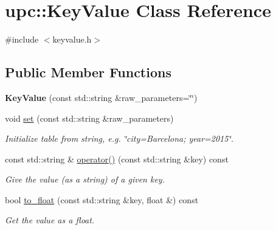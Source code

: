 \hypertarget{classupc_1_1KeyValue}{}\section{upc\+:\+:Key\+Value Class Reference}
\label{classupc_1_1KeyValue}


{\ttfamily \#include $<$keyvalue.\+h$>$}

\subsection*{Public Member Functions}
\begin{DoxyCompactItemize}
\item 
\mbox{\label{classupc_1_1KeyValue_a16e43218b2cdf234929ad76c6a28de51}} 
{\bfseries Key\+Value} (const std\+::string \&raw\+\_\+parameters=\char`\"{}\char`\"{})
\item 
\mbox{\label{classupc_1_1KeyValue_aff88fb11aa97cd85fa0b398e34ed763a}} 
void \hyperlink{classupc_1_1KeyValue_aff88fb11aa97cd85fa0b398e34ed763a}{set} (const std\+::string \&raw\+\_\+parameters)
\begin{DoxyCompactList}\small\item\em Initialize table from string, e.\+g. \char`\"{}city=\+Barcelona; year=2015\char`\"{}. \end{DoxyCompactList}\item 
\mbox{\label{classupc_1_1KeyValue_a4bdd73a8b0d777a5e98bb0d9953ea33a}} 
const std\+::string \& \hyperlink{classupc_1_1KeyValue_a4bdd73a8b0d777a5e98bb0d9953ea33a}{operator()} (const std\+::string \&key) const
\begin{DoxyCompactList}\small\item\em Give the value (as a string) of a given key. \end{DoxyCompactList}\item 
\mbox{\label{classupc_1_1KeyValue_a00557b32ed6051ba013ee2438b89caf5}} 
bool \hyperlink{classupc_1_1KeyValue_a00557b32ed6051ba013ee2438b89caf5}{to\+\_\+float} (const std\+::string \&key, float \&) const
\begin{DoxyCompactList}\small\item\em Get the value as a float. \end{DoxyCompactList}\item 

\end{DoxyCompactItemize}
